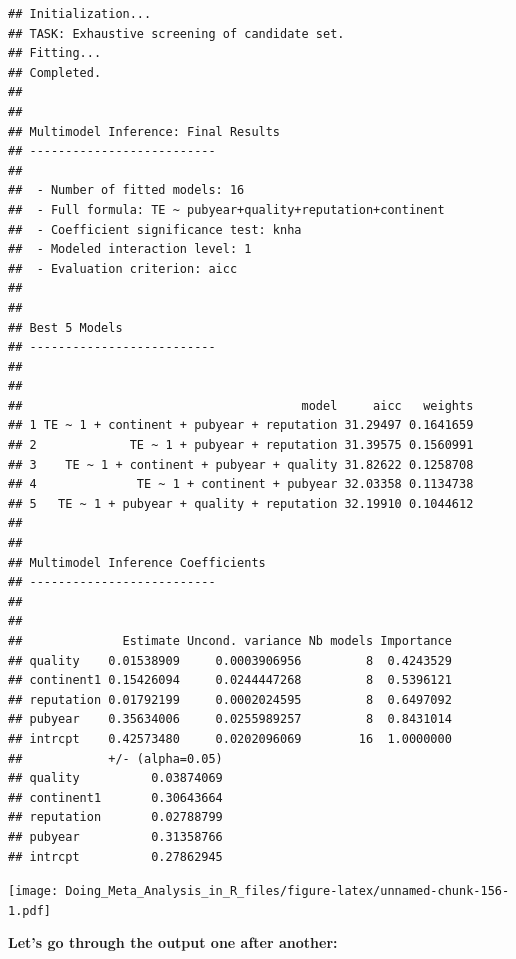 \documentclass[]{book}
\begin{document}
\begin{verbatim}
## Initialization...
## TASK: Exhaustive screening of candidate set.
## Fitting...
## Completed.
## 
## 
## Multimodel Inference: Final Results
## --------------------------
## 
##  - Number of fitted models: 16
##  - Full formula: TE ~ pubyear+quality+reputation+continent
##  - Coefficient significance test: knha
##  - Modeled interaction level: 1
##  - Evaluation criterion: aicc 
## 
## 
## Best 5 Models
## --------------------------
## 
## 
##                                       model     aicc   weights
## 1 TE ~ 1 + continent + pubyear + reputation 31.29497 0.1641659
## 2             TE ~ 1 + pubyear + reputation 31.39575 0.1560991
## 3    TE ~ 1 + continent + pubyear + quality 31.82622 0.1258708
## 4              TE ~ 1 + continent + pubyear 32.03358 0.1134738
## 5   TE ~ 1 + pubyear + quality + reputation 32.19910 0.1044612
## 
## 
## Multimodel Inference Coefficients
## --------------------------
## 
## 
##              Estimate Uncond. variance Nb models Importance
## quality    0.01538909     0.0003906956         8  0.4243529
## continent1 0.15426094     0.0244447268         8  0.5396121
## reputation 0.01792199     0.0002024595         8  0.6497092
## pubyear    0.35634006     0.0255989257         8  0.8431014
## intrcpt    0.42573480     0.0202096069        16  1.0000000
##            +/- (alpha=0.05)
## quality          0.03874069
## continent1       0.30643664
## reputation       0.02788799
## pubyear          0.31358766
## intrcpt          0.27862945
\end{verbatim}

\texttt{[image: Doing\_Meta\_Analysis\_in\_R\_files/figure-latex/unnamed-chunk-156-1.pdf]}

\textbf{Let's go through the output one after another:}
\end{document}
